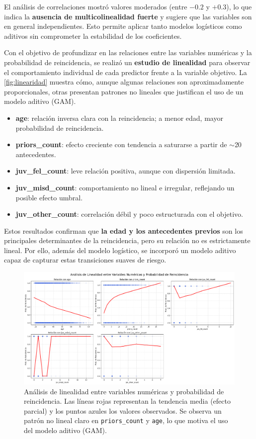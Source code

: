 El análisis de correlaciones mostró valores moderados (entre $-0.2$ y $+0.3$), lo que indica la \textbf{ausencia de multicolinealidad fuerte} y sugiere que las variables son en general independientes. Esto permite aplicar tanto modelos logísticos como aditivos sin comprometer la estabilidad de los coeficientes.

Con el objetivo de profundizar en las relaciones entre las variables numéricas y la probabilidad de reincidencia, se realizó un \textbf{estudio de linealidad} para observar el comportamiento individual de cada predictor frente a la variable objetivo. La \autoref{fig:linearidad} muestra cómo, aunque algunas relaciones son aproximadamente proporcionales, otras presentan patrones no lineales que justifican el uso de un modelo aditivo (GAM).

\begin{itemize}
  \item \textbf{age}: relación inversa clara con la reincidencia; a menor edad, mayor probabilidad de reincidencia.
  \item \textbf{priors\_count}: efecto creciente con tendencia a saturarse a partir de $\sim$20 antecedentes.
  \item \textbf{juv\_fel\_count}: leve relación positiva, aunque con dispersión limitada.
  \item \textbf{juv\_misd\_count}: comportamiento no lineal e irregular, reflejando un posible efecto umbral.
  \item \textbf{juv\_other\_count}: correlación débil y poco estructurada con el objetivo.
\end{itemize}

Estos resultados confirman que \textbf{la edad y los antecedentes previos} son los principales determinantes de la reincidencia, pero su relación no es estrictamente lineal. Por ello, además del modelo logístico, se incorporó un modelo aditivo capaz de capturar estas transiciones suaves de riesgo.

\begin{figure}[h]
  \centering
  \includegraphics[width=\linewidth]{figures/linearidad_variables.png}
  \caption{Análisis de linealidad entre variables numéricas y probabilidad de reincidencia. 
  Las líneas rojas representan la tendencia media (efecto parcial) y los puntos azules los valores observados. 
  Se observa un patrón no lineal claro en \texttt{priors\_count} y \texttt{age}, lo que motiva el uso del modelo aditivo (GAM).}
  \label{fig:linearidad}
\end{figure}

